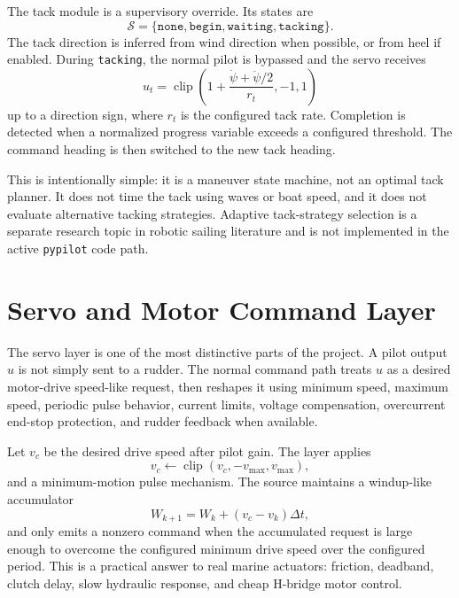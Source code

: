 \documentclass[11pt,twocolumn]{article}
\newcommand{\clip}{\operatorname{clip}}
\newcommand{\heading}{\psi}
\begin{document}
The tack module is a supervisory override.  Its states are
\begin{equation}
  \mathcal{S}=\{\texttt{none},\texttt{begin},\texttt{waiting},\texttt{tacking}\}.
\end{equation}
The tack direction is inferred from wind direction when possible, or from heel if enabled.
During \texttt{tacking}, the normal pilot is bypassed and the servo receives
\begin{equation}
  u_t = \clip\!\left(1 + \frac{\dot{\heading}+\ddot{\heading}/2}{r_t}, -1, 1\right)
\end{equation}
up to a direction sign, where \(r_t\) is the configured tack rate.  Completion is detected
when a normalized progress variable exceeds a configured threshold.  The command heading
is then switched to the new tack heading.

This is intentionally simple: it is a maneuver state machine, not an optimal tack planner.
It does not time the tack using waves or boat speed, and it does not evaluate alternative
tacking strategies.  Adaptive tack-strategy selection is a separate research topic in
robotic sailing literature and is not implemented in the active \texttt{pypilot} code path.

\section{Servo and Motor Command Layer}

The servo layer is one of the most distinctive parts of the project.  A pilot output
\(u\) is not simply sent to a rudder.  The normal command path treats \(u\) as a desired
motor-drive speed-like request, then reshapes it using minimum speed, maximum speed,
periodic pulse behavior, current limits, voltage compensation, overcurrent end-stop
protection, and rudder feedback when available.

Let \(v_c\) be the desired drive speed after pilot gain.  The layer applies
\begin{equation}
  v_c \leftarrow \clip(v_c, -v_{\max}, v_{\max}),
\end{equation}
and a minimum-motion pulse mechanism.  The source maintains a windup-like accumulator
\begin{equation}
  W_{k+1} = W_k + (v_c - v_k)\Delta t,
\end{equation}
and only emits a nonzero command when the accumulated request is large enough to overcome
the configured minimum drive speed over the configured period.  This is a practical answer
to real marine actuators: friction, deadband, clutch delay, slow hydraulic response, and
cheap H-bridge motor control.
\end{document}
